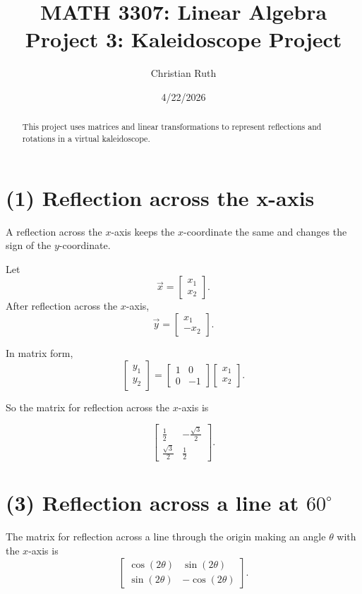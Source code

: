 \documentclass{ximera}
\title{MATH 3307: Linear Algebra \\ Project 3: Kaleidoscope Project}
\author{Christian Ruth}
\date{4/22/2026}
\begin{document}
\begin{abstract}
    This project uses matrices and linear transformations to represent reflections and rotations in a virtual kaleidoscope.
\end{abstract}

\maketitle

\section*{(1) Reflection across the x-axis}

A reflection across the $x$-axis keeps the $x$-coordinate the same and changes the sign of the $y$-coordinate.

Let
\[
\vec{x}=\begin{bmatrix}x_1\\x_2\end{bmatrix}.
\]
After reflection across the $x$-axis,
\[
\vec{y}=\begin{bmatrix}x_1\\-x_2\end{bmatrix}.
\]

In matrix form,
\[
\begin{bmatrix}
    y_1\\
    y_2
\end{bmatrix}
=
\begin{bmatrix}
    1 & 0\\
    0 & -1
\end{bmatrix}
\begin{bmatrix}
    x_1\\
    x_2
\end{bmatrix}.
\]

So the matrix for reflection across the $x$-axis is

\[
\begin{bmatrix}
\frac{1}{2} & -\frac{\sqrt{3}}{2}\\
\frac{\sqrt{3}}{2} & \frac{1}{2}
\end{bmatrix}.
\]

\section*{(3) Reflection across a line at $60^\circ$}

The matrix for reflection across a line through the origin making an angle $\theta$ with the $x$-axis is
\[
\begin{bmatrix}
\cos(2\theta) & \sin(2\theta)\\
\sin(2\theta) & -\cos(2\theta)
\end{bmatrix}.
\]
\end{document}
